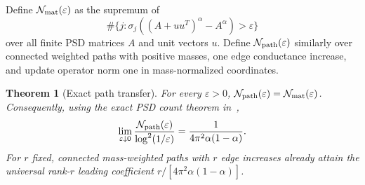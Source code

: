 \documentclass[11pt]{article}
\newtheorem{theorem}{Theorem}[section]
\begin{document}
Define $\mathcal N_{\rm mat}(\varepsilon)$ as the supremum of
\[
 \#\{j:\sigma_j((A+uu^T)^\alpha-A^\alpha)>\varepsilon\}
\]
over all finite PSD matrices $A$ and unit vectors $u$.
Define $\mathcal N_{\rm path}(\varepsilon)$ similarly over connected
weighted paths with positive masses, one edge conductance increase,
and update operator norm one in mass-normalized coordinates.

\begin{theorem}[Exact path transfer]\label{thm:path}
For every $\varepsilon>0$,
$\mathcal N_{\rm path}(\varepsilon)=\mathcal N_{\rm mat}(\varepsilon)$.
Consequently, using the exact PSD count theorem in~\cite{Companion},
\begin{equation}\label{eq:sharp}
 \lim_{\varepsilon\downarrow0}
 \frac{\mathcal N_{\rm path}(\varepsilon)}{\log^2(1/\varepsilon)}
       =\frac1{4\pi^2\alpha(1-\alpha)}.
\end{equation}
For $r$ fixed, connected mass-weighted paths with $r$ edge increases
already attain the universal rank-$r$ leading coefficient
$r/[4\pi^2\alpha(1-\alpha)]$.
\end{theorem}
\end{document}
